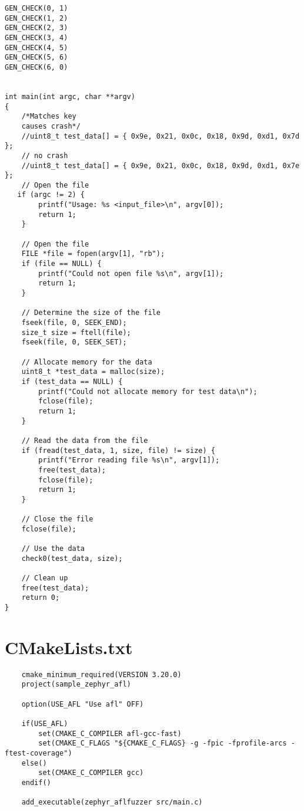 \begin{verbatim}
GEN_CHECK(0, 1)
GEN_CHECK(1, 2)
GEN_CHECK(2, 3)
GEN_CHECK(3, 4)
GEN_CHECK(4, 5)
GEN_CHECK(5, 6)
GEN_CHECK(6, 0)


int main(int argc, char **argv)
{
    /*Matches key
    causes crash*/
    //uint8_t test_data[] = { 0x9e, 0x21, 0x0c, 0x18, 0x9d, 0xd1, 0x7d };
    // no crash
    //uint8_t test_data[] = { 0x9e, 0x21, 0x0c, 0x18, 0x9d, 0xd1, 0x7e };
    // Open the file
   if (argc != 2) {
        printf("Usage: %s <input_file>\n", argv[0]);
        return 1;
    }

    // Open the file
    FILE *file = fopen(argv[1], "rb");
    if (file == NULL) {
        printf("Could not open file %s\n", argv[1]);
        return 1;
    }

    // Determine the size of the file
    fseek(file, 0, SEEK_END);
    size_t size = ftell(file);
    fseek(file, 0, SEEK_SET);

    // Allocate memory for the data
    uint8_t *test_data = malloc(size);
    if (test_data == NULL) {
        printf("Could not allocate memory for test data\n");
        fclose(file);
        return 1;
    }

    // Read the data from the file
    if (fread(test_data, 1, size, file) != size) {
        printf("Error reading file %s\n", argv[1]);
        free(test_data);
        fclose(file);
        return 1;
    }

    // Close the file
    fclose(file);

    // Use the data
    check0(test_data, size);

    // Clean up
    free(test_data);
    return 0;
}

\end{verbatim}

\section*{CMakeLists.txt}
\begin{verbatim}
    cmake_minimum_required(VERSION 3.20.0)
    project(sample_zephyr_afl)

    option(USE_AFL "Use afl" OFF)

    if(USE_AFL)
        set(CMAKE_C_COMPILER afl-gcc-fast)
        set(CMAKE_C_FLAGS "${CMAKE_C_FLAGS} -g -fpic -fprofile-arcs -ftest-coverage")
    else()
        set(CMAKE_C_COMPILER gcc)
    endif()

    add_executable(zephyr_aflfuzzer src/main.c)
    \end{verbatim}

\clearpage